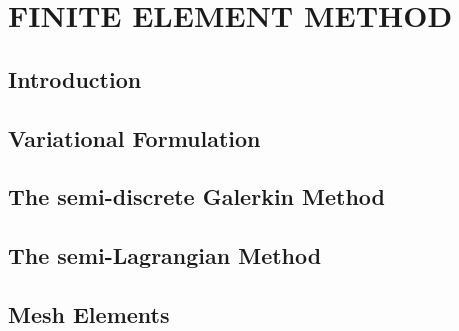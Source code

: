 \chapter{\textbf{FINITE ELEMENT METHOD}}
\label{metodo dos elementos finitos}

\section{\textbf{Introduction}} 


\section{\textbf{Variational Formulation}} 
\label{formulacao variacional}


\section{\textbf{The semi-discrete Galerkin Method}} 
\label{discretizacao espaco}


\section{\textbf{The semi-Lagrangian Method}} 
\label{discretizacao tempo}


\section{\textbf{Mesh Elements}} 
\label{elemento}




